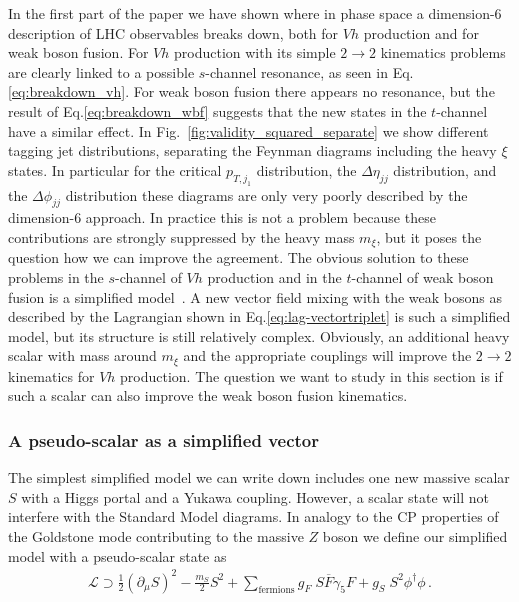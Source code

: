 In the first part of the paper we have shown where in phase space a
dimension-6 description of LHC observables breaks down, both for $Vh$
production and for weak boson fusion. For $Vh$ production with its
simple $2 \to 2$ kinematics problems are clearly linked to a possible
$s$-channel resonance, as seen in Eq.\;\eqref{eq:breakdown_vh}.  For
weak boson fusion there appears no resonance, but the result of
Eq.\;\eqref{eq:breakdown_wbf} suggests that the new states in the
$t$-channel have a similar effect.  In Fig.~\ref{fig:validity_squared_separate}
we show different tagging jet distributions, separating the Feynman
diagrams including the heavy $\xi$ states. In particular for the
critical $p_{T,j_1}$ distribution, the $\Delta \eta_{jj}$
distribution, and the $\Delta \phi_{jj}$ distribution these diagrams
are only very poorly described by the dimension-6 approach. In
practice this is not a problem because these contributions are
strongly suppressed by the heavy mass $m_\xi$, but it poses the
question how we can improve the agreement. The obvious solution to
these problems in the $s$-channel of $Vh$ production and in the
$t$-channel of weak boson fusion is a simplified
model~\cite{simp,simp_higgs}. A new vector field mixing with the weak
bosons as described by the Lagrangian shown in
Eq.\;\eqref{eq:lag-vectortriplet} is such a simplified model, but its
structure is still relatively complex. Obviously, an additional heavy
scalar with mass around $m_\xi$ and the appropriate couplings will
improve the $2 \to 2$ kinematics for $Vh$ production. The question we
want to study in this section is if such a scalar can also improve the
weak boson fusion kinematics.



\subsubsection*{A pseudo-scalar as a simplified vector}

The simplest simplified model we can write down includes one new
massive scalar $S$ with a Higgs portal and a Yukawa coupling. 
However, a scalar state will not interfere with the Standard Model
diagrams. In analogy to the CP properties of the Goldstone mode
contributing to the massive $Z$ boson we define our simplified model
with a pseudo-scalar state as
%
\begin{align}
\mathcal{L} \supset 
  \frac{1}{2} (\partial_\mu S)^2 
- \frac{m_S}{2} S^2 
+ \sum_\text{fermions} g_F \; S \overline{F} \gamma_5 F 
+ g_S \; S^2 \phi^\dagger \phi \,.
  \label{eq:simplified_model}
\end{align}

